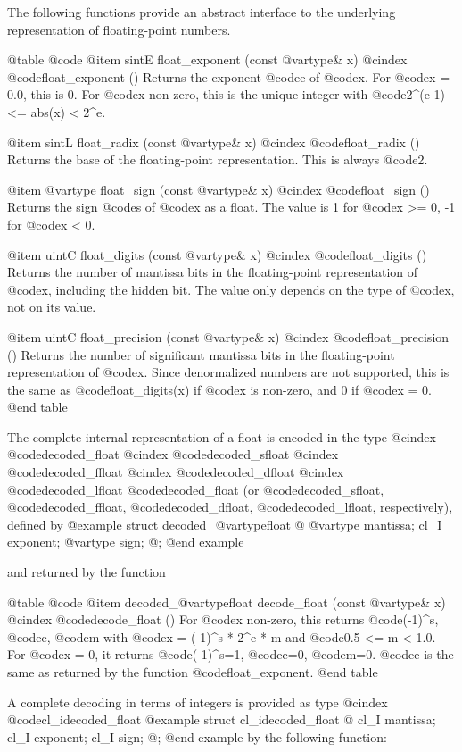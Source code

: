 The following functions provide an abstract interface to the underlying
representation of floating-point numbers.

@table @code
@item sintE float_exponent (const @var{type}& x)
@cindex @code{float_exponent ()}
Returns the exponent @code{e} of @code{x}.
For @code{x = 0.0}, this is 0. For @code{x} non-zero, this is the unique
integer with @code{2^(e-1) <= abs(x) < 2^e}.

@item sintL float_radix (const @var{type}& x)
@cindex @code{float_radix ()}
Returns the base of the floating-point representation. This is always @code{2}.

@item @var{type} float_sign (const @var{type}& x)
@cindex @code{float_sign ()}
Returns the sign @code{s} of @code{x} as a float. The value is 1 for
@code{x} >= 0, -1 for @code{x} < 0.

@item uintC float_digits (const @var{type}& x)
@cindex @code{float_digits ()}
Returns the number of mantissa bits in the floating-point representation
of @code{x}, including the hidden bit. The value only depends on the type
of @code{x}, not on its value.

@item uintC float_precision (const @var{type}& x)
@cindex @code{float_precision ()}
Returns the number of significant mantissa bits in the floating-point
representation of @code{x}. Since denormalized numbers are not supported,
this is the same as @code{float_digits(x)} if @code{x} is non-zero, and
0 if @code{x} = 0.
@end table

The complete internal representation of a float is encoded in the type
@cindex @code{decoded_float}
@cindex @code{decoded_sfloat}
@cindex @code{decoded_ffloat}
@cindex @code{decoded_dfloat}
@cindex @code{decoded_lfloat}
@code{decoded_float} (or @code{decoded_sfloat}, @code{decoded_ffloat},
@code{decoded_dfloat}, @code{decoded_lfloat}, respectively), defined by
@example
struct decoded_@var{type}float @{
        @var{type} mantissa; cl_I exponent; @var{type} sign;
@};
@end example

and returned by the function

@table @code
@item decoded_@var{type}float decode_float (const @var{type}& x)
@cindex @code{decode_float ()}
For @code{x} non-zero, this returns @code{(-1)^s}, @code{e}, @code{m} with
@code{x = (-1)^s * 2^e * m} and @code{0.5 <= m < 1.0}. For @code{x} = 0,
it returns @code{(-1)^s}=1, @code{e}=0, @code{m}=0.
@code{e} is the same as returned by the function @code{float_exponent}.
@end table

A complete decoding in terms of integers is provided as type
@cindex @code{cl_idecoded_float}
@example
struct cl_idecoded_float @{
        cl_I mantissa; cl_I exponent; cl_I sign;
@};
@end example
by the following function:

